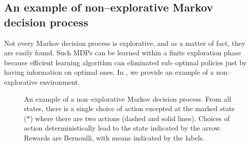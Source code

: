 \documentclass[preprint,cleveref,12pt]{colt2025}
\begin{document}
    \subsection{An example of non--explorative Markov decision process}
    \label{appendix_exploration_counter_example}

    Not every Markov decision process is explorative, and as a matter of fact, they are easily found. 
    Such MDPs can be learned within a finite exploration phase because efficient learning algorithm can eliminated sub--optimal policies just by having information on optimal ones. 
    In , we provide an example of a non--explorative environment. 

    \begin{figure}[ht]
        \centering
        \caption{
            \label{figure_non_explorative}
            An example of a non--explorative Markov decision process.
            From all states, there is a single choice of action excepted at the marked state ($*$) where there are two actions (dashed and solid lines).
            Choices of action deterministically lead to the state indicated by the arrow.
            Rewards are Bernoulli, with means indicated by the labels.
            \vspace{-1.5em}
        }
    \end{figure}
\end{document}

